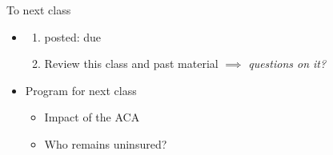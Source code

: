 \begin{frame}{To next class}
\begin{itemize}
    \item {}
    \begin{enumerate}
        \item {} posted: due 
        \item Review this class and past material $\implies$ \textit{questions on it?}
    \end{enumerate}
    \vspace{5mm}

    \item Program for next class
    \begin{itemize}
        \item Impact of the ACA
        \item Who remains uninsured?
    \end{itemize}
\end{itemize}
\end{frame}
